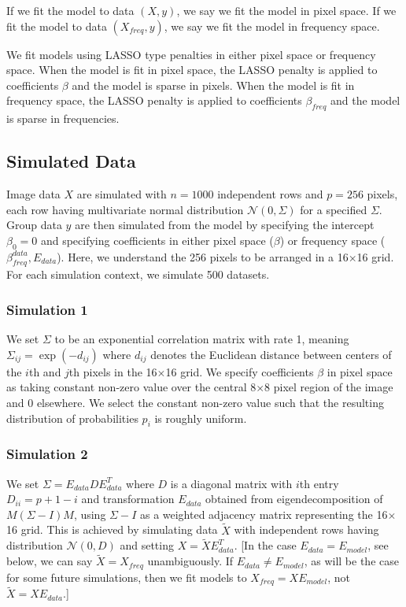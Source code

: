 \documentclass[12pt]{article}
\begin{document}
If we fit the model to data $(X,y)$, we say we fit the model in pixel space. If we fit the model to data $(X_{freq},y)$, we say we fit the model in frequency space. 

We fit models using LASSO type penalties in either pixel space or frequency space. When the model is fit in pixel space, the LASSO penalty is applied to coefficients $\beta$ and the model is sparse in pixels. When the model is fit in frequency space, the LASSO penalty is applied to coefficients $\beta_{freq}$ and the model is sparse in frequencies.

\subsection*{Simulated Data}

Image data $X$ are simulated with $n=1000$ independent rows and $p=256$ pixels, each row having multivariate normal distribution $\mathcal N(0,\Sigma)$ for a specified $\Sigma$. Group data $y$ are then simulated from the model by specifying the intercept $\beta_0=0$ and specifying coefficients in either pixel space ($\beta$) or frequency space ($\beta^{data}_{freq},E_{data}$). Here, we understand the 256 pixels to be arranged in a 16$\times$16 grid. For each simulation context, we simulate 500 datasets.

\subsubsection*{Simulation 1}

We set $\Sigma$ to be an exponential correlation matrix with rate 1, meaning $\Sigma_{ij}=\exp\left(-d_{ij}\right)$ where $d_{ij}$ denotes the Euclidean distance between centers of the $i$th and $j$th pixels in the 16$\times$16 grid. We specify coefficients $\beta$ in pixel space as taking constant non-zero value over the central 8$\times$8 pixel region of the image and 0 elsewhere. We select the constant non-zero value such that the resulting distribution of probabilities $p_i$ is roughly uniform.

\subsubsection*{Simulation 2}

We set $\Sigma=E_{data}DE_{data}^T$ where $D$ is a diagonal matrix with $i$th entry $D_{ii}=p+1-i$ and transformation $E_{data}$ obtained from eigendecomposition of $M(\Sigma-I)M$, using $\Sigma-I$ as a weighted adjacency matrix representing the 16$\times$16 grid. This is achieved by simulating data $\tilde X$ with independent rows having distribution $\mathcal N(0,D)$ and setting $X=\tilde X E_{data}^T$. [In the case $E_{data}=E_{model}$, see below, we can say $\tilde X=X_{freq}$ unambiguously. If $E_{data}\neq E_{model}$, as will be the case for some future simulations, then we fit models to $X_{freq}=XE_{model}$, not $\tilde X=XE_{data}$.]
\end{document}
